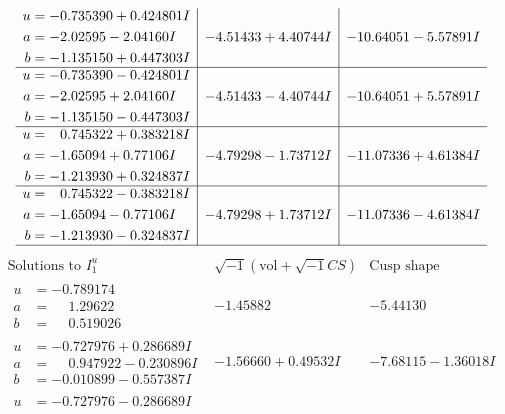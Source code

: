 \documentclass[1p]{elsarticle_modified}
\theoremstyle{definition}
\newcommand{\I}{\sqrt{-1}}
\begin{document}
$$\begin{array}{c|c|c}
\begin{aligned}
u &= -0.735390 + 0.424801 I \\
a &= -2.02595 - 2.04160 I \\
b &= -1.135150 + 0.447303 I\end{aligned}
 & -4.51433 + 4.40744 I & -10.64051 - 5.57891 I \\ \hline\begin{aligned}
u &= -0.735390 - 0.424801 I \\
a &= -2.02595 + 2.04160 I \\
b &= -1.135150 - 0.447303 I\end{aligned}
 & -4.51433 - 4.40744 I & -10.64051 + 5.57891 I \\ \hline\begin{aligned}
u &= \phantom{-}0.745322 + 0.383218 I \\
a &= -1.65094 + 0.77106 I \\
b &= -1.213930 + 0.324837 I\end{aligned}
 & -4.79298 - 1.73712 I & -11.07336 + 4.61384 I \\ \hline\begin{aligned}
u &= \phantom{-}0.745322 - 0.383218 I \\
a &= -1.65094 - 0.77106 I \\
b &= -1.213930 - 0.324837 I\end{aligned}
 & -4.79298 + 1.73712 I & -11.07336 - 4.61384 I\\
 \hline 
 \end{array}$$\newpage$$\begin{array}{c|c|c}  
\text{Solutions to }I^u_{1}& \I (\text{vol} + \sqrt{-1}CS) & \text{Cusp shape}\\
 \hline 
\begin{aligned}
u &= -0.789174\phantom{ +0.000000I} \\
a &= \phantom{-}1.29622\phantom{ +0.000000I} \\
b &= \phantom{-}0.519026\phantom{ +0.000000I}\end{aligned}
 & -1.45882\phantom{ +0.000000I} & -5.44130\phantom{ +0.000000I} \\ \hline\begin{aligned}
u &= -0.727976 + 0.286689 I \\
a &= \phantom{-}0.947922 - 0.230896 I \\
b &= -0.010899 - 0.557387 I\end{aligned}
 & -1.56660 + 0.49532 I & -7.68115 - 1.36018 I \\ \hline\begin{aligned}
u &= -0.727976 - 0.286689 I \\

\end{aligned}
\end{array}$$
\end{document}
